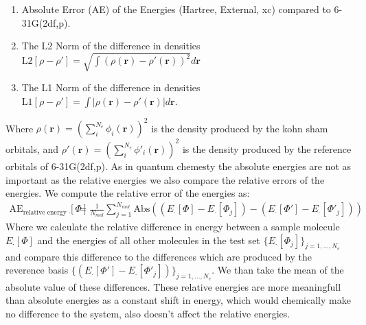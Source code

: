 \begin{enumerate}
    \item Absolute Error (AE) of the Energies (Hartree, External, xc) compared to  6-31G(2df,p).
    \item The L2 Norm of the difference in densities $\text{L2}[\rho-\rho'] = \sqrt{\int (\rho(\mathbf{r})-\rho'(\mathbf{r}))^2} d\mathbf{r}$
    \item The L1 Norm of the difference in densities $\text{L1}[\rho-\rho'] = \int |\rho(\mathbf{r})-\rho'(\mathbf{r})| d\mathbf{r}$.
\end{enumerate}
Where $\rho(\mathbf{r} ) = (\sum_i^{N_e} \phi_i(\mathbf{r}))^2$ is the density produced by the kohn sham orbitals, and $\rho'(\mathbf{r}) = (\sum_i^{N_e} \phi'_i(\mathbf{r}))^2$ is the density produced by the reference orbitals of 6-31G(2df,p). As in quantum chemesty the absolute energies are not as important as the relative energies we also compare the relative errors of the energies. We compute the relative error of the energies as:
\begin{align}
    \text{AE}_{\text{relative energy } \cdot} [\Phi]  &= \frac{1}{N_{mol}}\sum_{j=1}^{N_{mol}}\text{Abs}\left((E_\cdot[\Phi]-E_\cdot[\Phi_j])-(E_\cdot[\Phi']-E_\cdot[\Phi'_j])\right)
\end{align}
Where we calculate the relative difference in energy between a sample molecule $E_\cdot[\Phi]$ and the energies of all other molecules in the test set $\{E_\cdot[\Phi_j]\}_{j=1,...,N_e}$ and compare this difference to the differences which are produced by the reverence basis $\{(E_\cdot[\Phi']-E_\cdot[\Phi'_j])\}_{j=1,...,N_e}$. We than take the mean of the absolute value of these differences. These relative energies are more meaningfull than absolute energies as a constant shift in energy, which would chemically make no difference to the system, also doesn't affect the relative energies.
